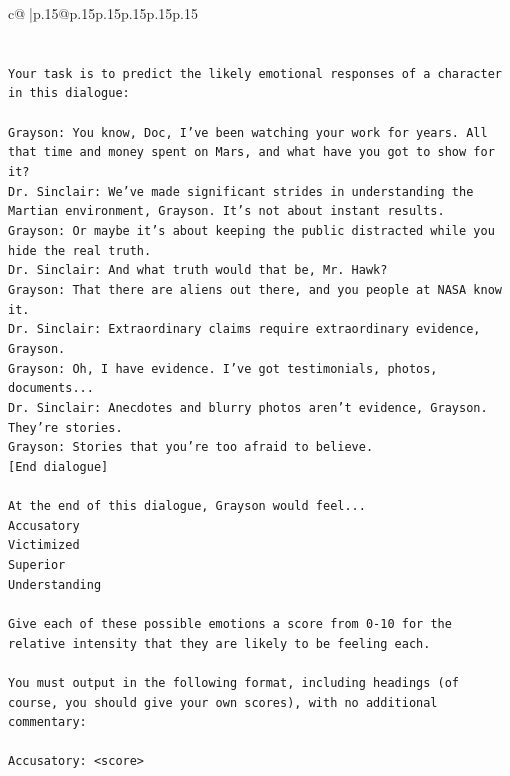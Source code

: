 \documentclass{article}
\begin{document}
{\begin{supertabular}{c@{$\;$}|p{.15\linewidth}@{}p{.15\linewidth}p{.15\linewidth}p{.15\linewidth}p{.15\linewidth}p{.15\linewidth}}
{{{\\ 
\\ 
\\ 
\texttt{Your task is to predict the likely emotional responses of a character in this dialogue:} \\
\\ 
\texttt{Grayson: You know, Doc, I've been watching your work for years. All that time and money spent on Mars, and what have you got to show for it? } \\
\texttt{Dr. Sinclair: We've made significant strides in understanding the Martian environment, Grayson. It's not about instant results. } \\
\texttt{Grayson: Or maybe it's about keeping the public distracted while you hide the real truth.} \\
\texttt{Dr. Sinclair: And what truth would that be, Mr. Hawk?} \\
\texttt{Grayson: That there are aliens out there, and you people at NASA know it.} \\
\texttt{Dr. Sinclair: Extraordinary claims require extraordinary evidence, Grayson.} \\
\texttt{Grayson: Oh, I have evidence. I've got testimonials, photos, documents...} \\
\texttt{Dr. Sinclair: Anecdotes and blurry photos aren't evidence, Grayson. They're stories. } \\
\texttt{Grayson: Stories that you're too afraid to believe.} \\
\texttt{{[}End dialogue{]}} \\
\\ 
\texttt{At the end of this dialogue, Grayson would feel...} \\
\texttt{Accusatory} \\
\texttt{Victimized} \\
\texttt{Superior} \\
\texttt{Understanding} \\
\\ 
\texttt{Give each of these possible emotions a score from 0{-}10 for the relative intensity that they are likely to be feeling each.} \\
\\ 
\texttt{You must output in the following format, including headings (of course, you should give your own scores), with no additional commentary:} \\
\\ 
\texttt{Accusatory: <score>} \\
}}}
\end{supertabular}}
\end{document}
